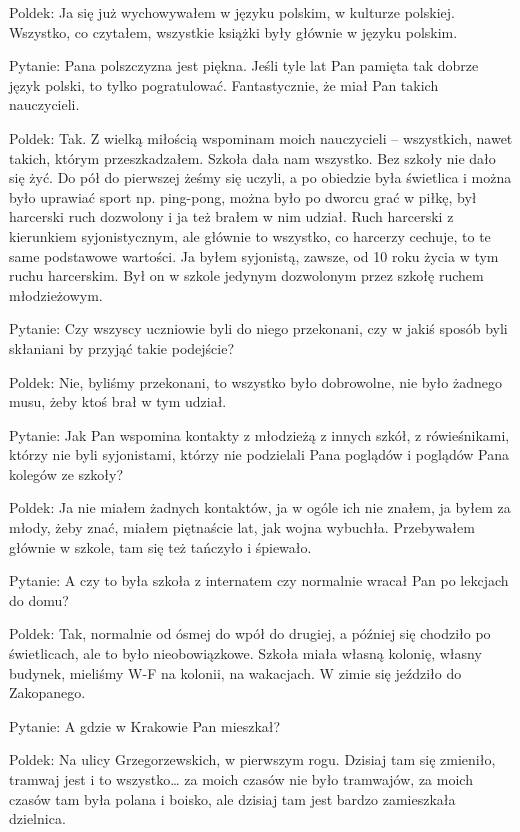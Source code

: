 Poldek: Ja się już wychowywałem w języku polskim, w kulturze polskiej. Wszystko, co czytałem, wszystkie książki były głównie w języku polskim. 

Pytanie: Pana polszczyzna jest piękna. Jeśli tyle lat Pan pamięta tak dobrze język polski, to tylko pogratulować. Fantastycznie, że miał Pan takich nauczycieli. 

Poldek: Tak. Z wielką miłością wspominam moich nauczycieli – wszystkich, nawet takich, którym przeszkadzałem. Szkoła dała nam wszystko. Bez szkoły nie dało się żyć. Do pół do pierwszej żeśmy się uczyli, a po obiedzie była świetlica i można było uprawiać sport np. ping-pong, można było po dworcu grać w piłkę, był harcerski ruch dozwolony i ja też brałem w nim udział. Ruch harcerski z kierunkiem syjonistycznym, ale głównie to wszystko, co harcerzy cechuje, to te same podstawowe wartości. Ja byłem syjonistą, zawsze, od 10 roku życia w tym ruchu harcerskim. Był on w szkole jedynym dozwolonym przez szkołę ruchem młodzieżowym. 

Pytanie: Czy wszyscy uczniowie byli do niego przekonani, czy w jakiś sposób byli skłaniani by przyjąć takie podejście? 

Poldek: Nie, byliśmy przekonani, to wszystko było dobrowolne, nie było żadnego musu, żeby ktoś brał w tym udział.  

Pytanie: Jak Pan wspomina kontakty z młodzieżą z innych szkół, z rówieśnikami, którzy nie byli syjonistami, którzy nie podzielali Pana poglądów i poglądów Pana kolegów ze szkoły? 

Poldek: Ja nie miałem żadnych kontaktów, ja w ogóle ich nie znałem, ja byłem za młody, żeby znać, miałem piętnaście lat, jak wojna wybuchła. Przebywałem głównie w szkole, tam się też tańczyło i śpiewało. 

Pytanie: A czy to była szkoła z internatem czy normalnie wracał Pan po lekcjach do domu? 

Poldek: Tak, normalnie od ósmej do wpół do drugiej, a później się chodziło po świetlicach, ale to było nieobowiązkowe. Szkoła miała własną kolonię, własny budynek, mieliśmy W-F na kolonii, na wakacjach. W zimie się jeździło do Zakopanego. 

Pytanie: A gdzie w Krakowie Pan mieszkał? 

Poldek: Na ulicy Grzegorzewskich, w pierwszym rogu. Dzisiaj tam się zmieniło, tramwaj jest i to wszystko… za moich czasów nie było tramwajów, za moich czasów tam była polana i boisko, ale dzisiaj tam jest bardzo zamieszkała dzielnica. 

